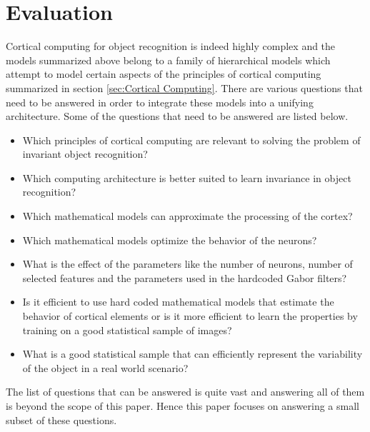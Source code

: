 \documentclass[12pt,twoside]{article}
\theoremstyle{plain}
\theoremstyle{definition}
\theoremstyle{remark}
\begin{document}
\section{Evaluation}
\label{sec:Eval}
Cortical computing for object recognition is indeed highly complex and the models summarized above belong to a family of hierarchical models which attempt to model certain aspects of the principles of cortical computing summarized in section \ref{sec:Cortical Computing}. There are various questions that need to be answered in order to integrate these models into a unifying architecture. Some of the questions that need to be answered are listed below. 
\begin{itemize}
\item Which principles of cortical computing are relevant to solving the problem of invariant object recognition? 
\item Which computing architecture is better suited to learn invariance in object recognition? 
\item Which mathematical models can approximate the processing of the cortex? 
\item Which mathematical models optimize the behavior of the neurons?
\item What is the effect of the parameters like the number of neurons, number of selected features and the parameters used in the hardcoded Gabor filters? 
\item Is it efficient to use hard coded mathematical models that estimate the behavior of cortical elements or is it more efficient to learn the properties by training on a good statistical sample of images?
\item What is a good statistical sample that can efficiently represent the variability of the object in a real world scenario?
\end{itemize}
The list of questions that can be answered is quite vast and answering all of them is beyond the scope of this paper. Hence this paper focuses on answering a small subset of these questions. 
\end{document}
